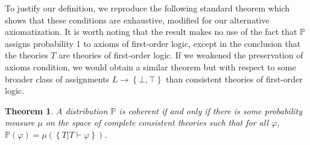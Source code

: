 \documentclass[12pt]{article}
\newtheorem{theorem}{Theorem}
\theoremstyle{definition}
\newcommand{\of}[1]{\left(#1\right)}
\renewcommand{\b}[1]{\left\{#1\right\}}
\newcommand{\bc}[2]{\left\{#1\left|#2\right.\right\}}
\newcommand{\PP}{\mathbb{P}}
\renewcommand{\P}[1]{\mathbb{P}\of{#1}}
\newcommand{\vp}{\varphi}
\begin{document}
To justify our definition, we reproduce the following standard theorem
which shows that these conditions are exhaustive, modified
for our alternative axiomatization.
It is worth noting that the result makes no use of the fact that
$\PP$ assigns probability 1 to axioms of first-order logic,
except in the conclusion that the theories $T$ are theories of first-order logic.
If we weakened the preservation of axioms condition,
we would obtain a similar theorem but with respect to some broader
class of assignments $L \rightarrow \b{\bot, \top}$ than consistent
theories of first-order logic.
\begin{theorem}\label{distribution}
A distribution $\PP$ is coherent if and only if there
is some probability measure $\mu$ on the space of complete consistent
theories such that for all $\vp$, $\P{\vp} = \mu\of{\bc{T}{T \vdash \vp}}$.
\end{theorem}
\end{document}
